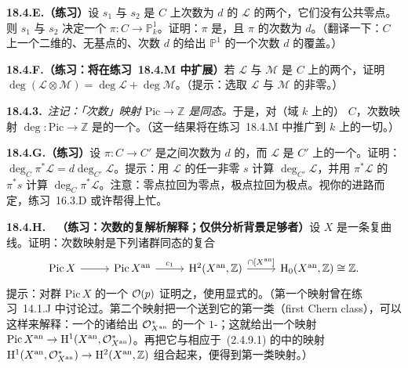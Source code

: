 \textbf{18.4.E.（练习）}\quad 设 $s_1$ 与 $s_2$ 是\trIrreducible\trRegular\trProjective{}\trCurve{} $C$ 上次数为 $d$ 的\trLineBundle{} $\mathscr{L}$ 的两个\trSection，它们没有公共零点。则 $s_1$ 与 $s_2$ 决定一个\trMorphism{} $\pi\colon C\to\mathbb{P}^1_k$。证明：$\pi$ 是\trFinite\trMorphism，且 $\pi$ 的次数为 $d$。（翻译一下：$C$ 上一个二维的、无基点的、次数 $d$ 的\trLinearSystem{}给出 $\mathbb{P}^1$ 的一个次数 $d$ 的\trFinite{}覆盖。）

\textbf{18.4.F.（练习：将在\mbox{练习~18.4.M} 中扩展）}\quad 若 $\mathscr{L}$ 与 $\mathscr{M}$ 是\trRegular\trProjective{}\trCurve{} $C$ 上的两个\trLineBundle，证明 $\deg(\mathscr{L}\otimes\mathscr{M})=\deg\mathscr{L}+\deg\mathscr{M}$。（提示：选取 $\mathscr{L}$ 与 $\mathscr{M}$ 的非零\trRational{}\trSection。）

\textbf{18.4.3.}\ \emph{注记：「次数」映射 $\mathrm{Pic}\to\mathbb{Z}$ 是同态。}\quad 于是，对（域 $k$ 上的）\trRegular\trProjective{}\trCurve{} $C$，次数映射 $\deg\colon\mathrm{Pic}\to\mathbb{Z}$ 是\trAbelianGroups{}的一个\trHomomorphism。（这一结果将在\mbox{练习~18.4.M} 中推广到 $k$ 上的一切\trProper{}\trCurve。）

\textbf{18.4.G.（练习）}\quad 设 $\pi\colon C\to C'$ 是\trIntegral\trProjective\trRegular{}\trCurve{}之间次数为 $d$ 的\trMorphism，而 $\mathscr{L}$ 是 $C'$ 上的一个\trInvertibleSheaf。证明：$\deg_C\pi^*\mathscr{L}=d\deg_{C'}\mathscr{L}$。提示：用 $\mathscr{L}$ 的任一非零\trRational{}\trSection{} $s$ 计算 $\deg_{C'}\mathscr{L}$，并用 $\pi^*\mathscr{L}$ 的\trRational{}\trSection{} $\pi^*s$ 计算 $\deg_C\pi^*\mathscr{L}$。注意：零点拉回为零点，极点拉回为极点。视你的进路而定，\mbox{练习~16.3.D} 或许帮得上忙。

\textbf{18.4.H.}\ \extrahard\ \textbf{（练习：次数的复解析解释；仅供分析背景足够者）}\quad 设 $X$ 是一条\trConnected\trRegular\trProjective{}复曲线。证明：次数映射是下列诸群同态的复合
\[
\begin{tikzcd}[column sep=2.6em]
\mathrm{Pic}\,X \ar[r] & \mathrm{Pic}\,X^{\mathrm{an}} \ar[r, "c_1"] & \mathrm{H}^2(X^{\mathrm{an}},\mathbb{Z}) \ar[r, "{\cap[X^{\mathrm{an}}]}"] & \mathrm{H}_0(X^{\mathrm{an}},\mathbb{Z}) \cong \mathbb{Z}.
\end{tikzcd}
\]
提示：对群 $\mathrm{Pic}\,X$ 的一个\trGenerator{} $\mathcal{O}(p)$ 证明之，使用显式的\trTransitionFunction。（第一个映射曾在\mbox{练习~14.1.J} 中讨论过。第二个映射把一个\trLineBundle{}送到它的第一\trChern{}类（first Chern class），可以这样来解释：一个\trLineBundle{}的诸\trTransitionFunction{}给出 $\mathcal{O}^*_{X^{\mathrm{an}}}$ 的一个\trCech{} $1$-\trCycle；这就给出一个映射 $\mathrm{Pic}\,X^{\mathrm{an}}\to\mathrm{H}^1(X^{\mathrm{an}},\mathcal{O}^*_{X^{\mathrm{an}}})$。再把它与相应于\trExponentialSequence{}~\mbox{(2.4.9.1)} 的\trCohomology{}\trLongExactSequence{}中的映射 $\mathrm{H}^1(X^{\mathrm{an}},\mathcal{O}^*_{X^{\mathrm{an}}})\to\mathrm{H}^2(X^{\mathrm{an}},\mathbb{Z})$ 组合起来，便得到第一\trChern{}类映射。）

